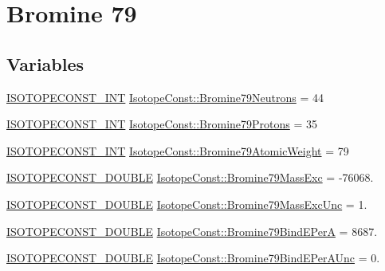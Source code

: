 \hypertarget{group___isotope_const-_bromine-_br79}{}\section{Bromine 79}
\label{group___isotope_const-_bromine-_br79}
\subsection*{Variables}
\begin{DoxyCompactItemize}
\item 
\mbox{\hyperlink{group___isotope_const-_macros_ga5f18360b3e99483a35c32d789e62621c}{I\+S\+O\+T\+O\+P\+E\+C\+O\+N\+S\+T\+\_\+\+I\+NT}} \mbox{\hyperlink{group___isotope_const-_bromine-_br79_ga83b2f3fe9c1d1b0b591b4c009b3a1fad}{Isotope\+Const\+::\+Bromine79\+Neutrons}} = 44
\item 
\mbox{\hyperlink{group___isotope_const-_macros_ga5f18360b3e99483a35c32d789e62621c}{I\+S\+O\+T\+O\+P\+E\+C\+O\+N\+S\+T\+\_\+\+I\+NT}} \mbox{\hyperlink{group___isotope_const-_bromine-_br79_ga7ab9a9a2a7f5f46381da4f72f6d94ae3}{Isotope\+Const\+::\+Bromine79\+Protons}} = 35
\item 
\mbox{\hyperlink{group___isotope_const-_macros_ga5f18360b3e99483a35c32d789e62621c}{I\+S\+O\+T\+O\+P\+E\+C\+O\+N\+S\+T\+\_\+\+I\+NT}} \mbox{\hyperlink{group___isotope_const-_bromine-_br79_gaac2d291cc08950fb033dade391f5f0fb}{Isotope\+Const\+::\+Bromine79\+Atomic\+Weight}} = 79
\item 
\mbox{\hyperlink{group___isotope_const-_macros_ga8f45a7272ce02c0b4c65c44636ed719a}{I\+S\+O\+T\+O\+P\+E\+C\+O\+N\+S\+T\+\_\+\+D\+O\+U\+B\+LE}} \mbox{\hyperlink{group___isotope_const-_bromine-_br79_gaebd9533abff22fd5f0f534d8f4d0d997}{Isotope\+Const\+::\+Bromine79\+Mass\+Exc}} = -\/76068.
\item 
\mbox{\hyperlink{group___isotope_const-_macros_ga8f45a7272ce02c0b4c65c44636ed719a}{I\+S\+O\+T\+O\+P\+E\+C\+O\+N\+S\+T\+\_\+\+D\+O\+U\+B\+LE}} \mbox{\hyperlink{group___isotope_const-_bromine-_br79_ga016f1c107875d8fe23c41fa6575b349e}{Isotope\+Const\+::\+Bromine79\+Mass\+Exc\+Unc}} = 1.
\item 
\mbox{\hyperlink{group___isotope_const-_macros_ga8f45a7272ce02c0b4c65c44636ed719a}{I\+S\+O\+T\+O\+P\+E\+C\+O\+N\+S\+T\+\_\+\+D\+O\+U\+B\+LE}} \mbox{\hyperlink{group___isotope_const-_bromine-_br79_gaaba1caa3d3165822c00c816ab8df9949}{Isotope\+Const\+::\+Bromine79\+Bind\+E\+PerA}} = 8687.
\item 
\mbox{\hyperlink{group___isotope_const-_macros_ga8f45a7272ce02c0b4c65c44636ed719a}{I\+S\+O\+T\+O\+P\+E\+C\+O\+N\+S\+T\+\_\+\+D\+O\+U\+B\+LE}} \mbox{\hyperlink{group___isotope_const-_bromine-_br79_ga288558049031e834c11e33d2ce5a9409}{Isotope\+Const\+::\+Bromine79\+Bind\+E\+Per\+A\+Unc}} = 0.

\end{DoxyCompactItemize}
